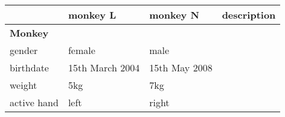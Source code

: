 \begin{table}[]
\scriptsize
\begin{tabular}{|l|l|l|l|l|l|l|l|}
\hline
                                                                                              & \multicolumn{3}{l|}{\textbf{monkey L}}                                                                   & \multicolumn{3}{l|}{\textbf{monkey N}}                                                            & \textbf{description}                                                                             \\ \hline
\multicolumn{8}{|l|}{\textbf{Monkey}}                                                                                                                                                                                                                                                                                                                                                                           \\ \hline
gender                                                                                        & \multicolumn{3}{l|}{female}                                                                              & \multicolumn{3}{l|}{male}                                                                         &                                                                                                  \\ \hline
birthdate                                                                                     & \multicolumn{3}{l|}{15th March 2004}                                                                     & \multicolumn{3}{l|}{15th May 2008}                                                                &                                                                                                  \\ \hline
weight                                                                                        & \multicolumn{3}{l|}{5kg}                                                                                 & \multicolumn{3}{l|}{7kg}                                                                          &                                                                                                  \\ \hline
active hand                                                                                   & \multicolumn{3}{l|}{left}                                                                                & \multicolumn{3}{l|}{right}                                                                        &                                                                                                  \\ \hline

\end{tabular}
\end{table}
